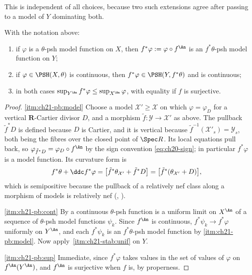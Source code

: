 This is independent of all choices, because two such extensions agree after
passing to a model of $Y$ dominating both.

\begin{proposition}
\label{prop:ch21-pullback}
With the notation above:
\begin{enumerate}
\item\label{itm:ch21-pb:model}
if $\varphi$ is a $\theta$-psh model function on $X$, then
$f^*\varphi:=\varphi\circ f^{\An}$ is an $f^*\theta$-psh model function
on $Y$;
\item\label{itm:ch21-pb:cont}
if $\varphi\in\PSH(X,\theta)$ is continuous, then
$f^*\varphi\in\PSH(Y,f^*\theta)$ and is continuous;
\item\label{itm:ch21-pb:sup}
in both cases $\sup_{Y^{\An}}f^*\varphi\leq\sup_{X^{\An}}\varphi$, with
equality if $f$ is surjective.
\end{enumerate}
\end{proposition}

\begin{proof}
\cref{itm:ch21-pb:model}  Choose a model $\mathcal X'\geq\mathcal X$ on
which $\varphi=\varphi_D$ for a vertical $\mathbf R$-Cartier divisor
$D$, and a morphism $\tilde f:\mathcal Y\to\mathcal X'$ as above.  The
pullback $\tilde f^*D$ is defined because $D$ is Cartier, and it is
vertical because $\tilde f^{-1}(\mathcal X'_s)=\mathcal Y_s$, both being
the fibres over the closed point of $\Spec R$.  Its local equations pull
back, so $\varphi_{\tilde f^*D}=\varphi_D\circ f^{\An}$ by the sign
convention \eqref{eq:ch20-sign}; in particular $f^*\varphi$ is a model
function.  Its curvature form is
\[
 f^*\theta+\ddc f^*\varphi
 =\bigl[\tilde f^*\theta_{\mathcal X'}+\tilde f^*D\bigr]
 =\bigl[\tilde f^*(\theta_{\mathcal X'}+D)\bigr],
\]
which is semipositive because the pullback of a relatively nef class along a
morphism of models is relatively nef
(, ).

\cref{itm:ch21-pb:cont}  By  a continuous
$\theta$-psh function is a uniform limit on $X^{\An}$ of a sequence of
$\theta$-psh model functions $\psi_k$.  Since $f^{\An}$ is continuous,
$f^*\psi_k\to f^*\varphi$ uniformly on $Y^{\An}$, and each
$f^*\psi_k$ is an $f^*\theta$-psh model function by
\cref{itm:ch21-pb:model}.  Now apply
\,\cref{itm:ch21-stab:unif} on $Y$.

\cref{itm:ch21-pb:sup}  Immediate, since $f^*\varphi$ takes values in the
set of values of $\varphi$ on $f^{\An}(Y^{\An})$, and $f^{\An}$ is
surjective when $f$ is, by properness.
\end{proof}

